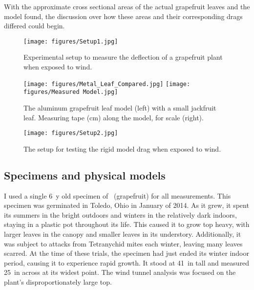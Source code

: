With the approximate cross sectional areas of the actual grapefruit leaves and the model found, the discussion over how these areas and their corresponding drags differed could begin.


\begin{figure}
\begin{center}
\texttt{[image: figures/Setup1.jpg]} 
\end{center}
\caption{Experimental setup to measure the deflection of a grapefruit plant when exposed to wind.}
\label{fig:methods1}
\end{figure}

\begin{figure}
\begin{center}
\texttt{[image: figures/Metal\_Leaf\_Compared.jpg]}
\texttt{[image: figures/Measured Model.jpg]}
\end{center}
\caption{The aluminum grapefruit leaf model (left) with a small jackfruit leaf. Measuring tape (cm) along the model, for scale (right).}
\label{fig:methods2}
\end{figure}

\begin{figure}
\begin{center}
\texttt{[image: figures/Setup2.jpg]}
\end{center}
\caption{The setup for testing the rigid model drag when exposed to wind.}
\label{fig:methods3}
\end{figure}




\subsection{Specimens and physical models}
I used a single \SI{6}{y} old specimen of \Citrusxparadisi\ (grapefruit) for all measurements. This specimen was germinated in Toledo, Ohio in January of 2014. As it grew, it spent its summers in the bright outdoors and winters in the relatively dark indoors, staying in a plastic pot throughout its life. This caused it to grow top heavy, with larger leaves in the canopy and smaller leaves in its understory. Additionally, it was subject to attacks from Tetranychid mites each winter, leaving many leaves scarred. At the time of these trials, the specimen had just ended its winter indoor period, causing it to experience rapid growth. It stood at \SI{41}{in} tall and measured \SI{25}{in} across at its widest point. The wind tunnel analysis was focused on the plant's disproportionately large top.

